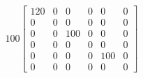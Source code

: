 \documentclass[preview]{standalone}
\begin{document}
\begin{align*}
100 \left[\begin{matrix}120 & 0 & 0 & 0 & 0 & 0\\0 & 0 & 0 & 0 & 0 & 0\\0 & 0 & 100 & 0 & 0 & 0\\0 & 0 & 0 & 0 & 0 & 0\\0 & 0 & 0 & 0 & 100 & 0\\0 & 0 & 0 & 0 & 0 & 0\end{matrix}\right]
\end{align*}
\end{document}
